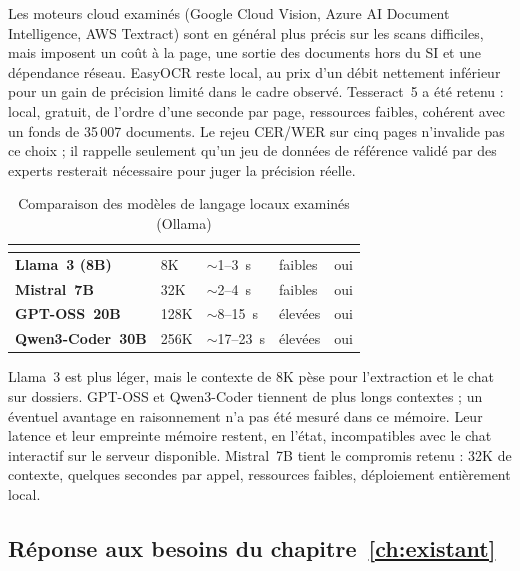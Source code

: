 Les moteurs cloud examinés (Google Cloud Vision, Azure AI Document Intelligence, AWS Textract) sont en général plus précis sur les scans difficiles, mais imposent un coût à la page, une sortie des documents hors du SI et une dépendance réseau. EasyOCR reste local, au prix d'un débit nettement inférieur pour un gain de précision limité dans le cadre observé. Tesseract~5 a été retenu : local, gratuit, de l'ordre d'une seconde par page, ressources faibles, cohérent avec un fonds de 35\,007 documents. Le rejeu CER/WER sur cinq pages n'invalide pas ce choix ; il rappelle seulement qu'un jeu de données de référence validé par des experts resterait nécessaire pour juger la précision réelle.

\begin{table}[htbp]
\centering
\caption{Comparaison des modèles de langage locaux examinés (Ollama)}
\label{tab:choix-llm}
\small
\renewcommand{\arraystretch}{1.40}
\begingroup
{}
\begin{tabularx}{\textwidth}{@{}>{\bfseries}L{3.6cm}YYYY@{}}
\toprule
{}
 &
 &
 &
 &
 \\
\midrule
Llama~3 (8B) & 8K & $\sim$1--3~s & faibles & oui \\
Mistral~7B & 32K & $\sim$2--4~s & faibles & oui \\
GPT-OSS~20B & 128K & $\sim$8--15~s & élevées & oui \\
Qwen3-Coder~30B & 256K & $\sim$17--23~s & élevées & oui \\
\bottomrule
\end{tabularx}
\endgroup
\end{table}

Llama~3 est plus léger, mais le contexte de 8K pèse pour l'extraction et le chat sur dossiers. GPT-OSS et Qwen3-Coder tiennent de plus longs contextes ; un éventuel avantage en raisonnement n'a pas été mesuré dans ce mémoire. Leur latence et leur empreinte mémoire restent, en l'état, incompatibles avec le chat interactif sur le serveur disponible. Mistral~7B tient le compromis retenu : 32K de contexte, quelques secondes par appel, ressources faibles, déploiement entièrement local.

\subsection{Réponse aux besoins du chapitre~\ref{ch:existant}}

